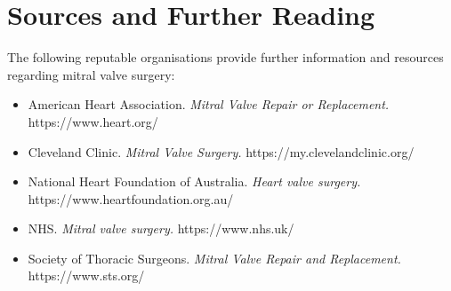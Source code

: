 \section*{Sources and Further Reading}
The following reputable organisations provide further information and resources regarding mitral valve surgery:
\begin{itemize}
    \item American Heart Association. \textit{Mitral Valve Repair or Replacement.} https://www.heart.org/
    \item Cleveland Clinic. \textit{Mitral Valve Surgery.} https://my.clevelandclinic.org/
    \item National Heart Foundation of Australia. \textit{Heart valve surgery.} https://www.heartfoundation.org.au/
    \item NHS. \textit{Mitral valve surgery.} https://www.nhs.uk/
    \item Society of Thoracic Surgeons. \textit{Mitral Valve Repair and Replacement.} https://www.sts.org/
\end{itemize}

